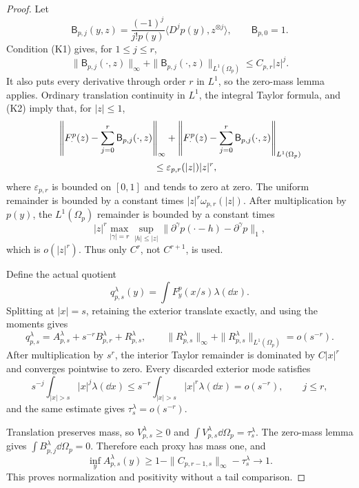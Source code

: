 \begin{proof}
Let
\[
 \mathsf B_{p,j}(y,z)=
 \frac{(-1)^j}{j!p(y)}\langle D^jp(y),z^{\otimes j}\rangle,
 \qquad \mathsf B_{p,0}=1.
\]
Condition \textup{(K1)} gives, for \(1\le j\le r\),
\begin{equation}\label{eq:abstract-tail-mode-bounds}
 \|\mathsf B_{p,j}(\mathord\cdot,z)\|_\infty
 +\|\mathsf B_{p,j}(\mathord\cdot,z)\|_{L^1(\Omega_p)}
 \le C_{p,r}|z|^j.
\end{equation}
It also puts every derivative through order \(r\) in \(L^1\), so the
zero-mass lemma applies.  Ordinary translation continuity in \(L^1\), the
integral Taylor formula, and \textup{(K2)} imply that, for \(|z|\le1\),
\begin{align}
 &\left\|F_\cdot^p(z)-\sum_{j=0}^r
       \mathsf B_{p,j}(\mathord\cdot,z)\right\|_\infty
 +\left\|F_\cdot^p(z)-\sum_{j=0}^r
       \mathsf B_{p,j}(\mathord\cdot,z)\right\|_{L^1(\Omega_p)}\notag\\
 &\hspace{35mm}\le \varepsilon_{p,r}(|z|)|z|^r,
 \label{eq:abstract-tail-local-remainder}
\end{align}
where \(\varepsilon_{p,r}\) is bounded on \([0,1]\) and tends to zero at
zero.  The uniform remainder is bounded by a constant times
\(|z|^r\omega_{p,r}(|z|)\).  After multiplication by \(p(y)\), the
\(L^1(\Omega_p)\) remainder is bounded by a constant times
\[
 |z|^r\max_{|\gamma|=r}\sup_{|h|\le|z|}
 \|\partial^\gamma p(\mathord\cdot-h)-\partial^\gamma p\|_1,
\]
which is \(o(|z|^r)\).  Thus only \(C^r\), not \(C^{r+1}\), is used.

Define the actual quotient
\[
 q_{p,s}^\lambda(y)=\int F_y^p(x/s)\lambda(\dd x).
\]
Splitting at \(|x|=s\), retaining the exterior translate exactly, and using
the moments gives
\begin{equation}\label{eq:abstract-tail-exact-quotient-split}
 q_{p,s}^\lambda
 =A_{p,s}^\lambda+s^{-r}B_{p,r}^\lambda+R_{p,s}^\lambda,
 \qquad
 \|R_{p,s}^\lambda\|_\infty
 +\|R_{p,s}^\lambda\|_{L^1(\Omega_p)}=o(s^{-r}).
\end{equation}
After multiplication by \(s^r\), the interior Taylor remainder is dominated
by \(C|x|^r\) and converges pointwise to zero.  Every discarded exterior
mode satisfies
\[
 s^{-j}\int_{|x|>s}|x|^j\lambda(\dd x)
 \le s^{-r}\int_{|x|>s}|x|^r\lambda(\dd x)=o(s^{-r}),
 \qquad j\le r,
\]
and the same estimate gives \(\tau_s^\lambda=o(s^{-r})\).

Translation preserves mass, so \(V_{p,s}^\lambda\ge0\) and
\(\int V_{p,s}^\lambda\dd\Omega_p=\tau_s^\lambda\).  The zero-mass lemma
gives \(\int B_{p,j}^\lambda\dd\Omega_p=0\).  Therefore each proxy has mass
one, and
\[
 \inf_yA_{p,s}^\lambda(y)
 \ge1-\|C_{p,r-1,s}\|_\infty-\tau_s^\lambda\longrightarrow1.
\]
This proves normalization and positivity without a tail comparison.


\end{proof}
